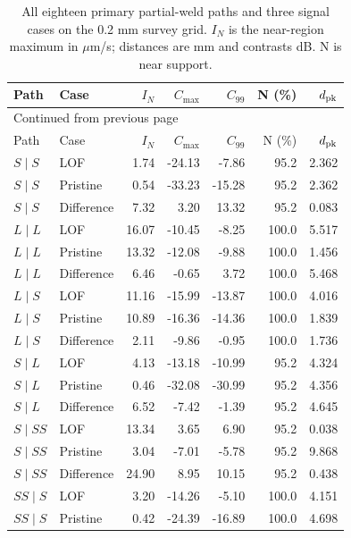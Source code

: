 {\small\setlength{\tabcolsep}{4pt}
\begin{longtable}{@{}llrrrrr@{}}
\caption{All eighteen primary partial-weld paths and three signal cases on the 0.2 mm survey grid. $I_N$ is the near-region maximum in $\mu$m/s; distances are mm and contrasts dB. N is near support.}\label{saftapp:archive:partial:primary_register}\\
\toprule Path & Case & $I_N$ & $C_{\max}$ & $C_{99}$ & N (\%) & $d_{\rm pk}$\\\midrule\endfirsthead
\multicolumn{7}{l}{\small Continued from previous page}\\\toprule Path & Case & $I_N$ & $C_{\max}$ & $C_{99}$ & N (\%) & $d_{\rm pk}$\\\midrule\endhead
\bottomrule\endfoot
$S\mid S$ & LOF & 1.74 & -24.13 & -7.86 & 95.2 & 2.362 \\
$S\mid S$ & Pristine & 0.54 & -33.23 & -15.28 & 95.2 & 2.362 \\
$S\mid S$ & Difference & 7.32 & 3.20 & 13.32 & 95.2 & 0.083 \\
\addlinespace
$L\mid L$ & LOF & 16.07 & -10.45 & -8.25 & 100.0 & 5.517 \\
$L\mid L$ & Pristine & 13.32 & -12.08 & -9.88 & 100.0 & 1.456 \\
$L\mid L$ & Difference & 6.46 & -0.65 & 3.72 & 100.0 & 5.468 \\
\addlinespace
$L\mid S$ & LOF & 11.16 & -15.99 & -13.87 & 100.0 & 4.016 \\
$L\mid S$ & Pristine & 10.89 & -16.36 & -14.36 & 100.0 & 1.839 \\
$L\mid S$ & Difference & 2.11 & -9.86 & -0.95 & 100.0 & 1.736 \\
\addlinespace
$S\mid L$ & LOF & 4.13 & -13.18 & -10.99 & 95.2 & 4.324 \\
$S\mid L$ & Pristine & 0.46 & -32.08 & -30.99 & 95.2 & 4.356 \\
$S\mid L$ & Difference & 6.52 & -7.42 & -1.39 & 95.2 & 4.645 \\
\addlinespace
$S\mid SS$ & LOF & 13.34 & 3.65 & 6.90 & 95.2 & 0.038 \\
$S\mid SS$ & Pristine & 3.04 & -7.01 & -5.78 & 95.2 & 9.868 \\
$S\mid SS$ & Difference & 24.90 & 8.95 & 10.15 & 95.2 & 0.438 \\
\addlinespace
$SS\mid S$ & LOF & 3.20 & -14.26 & -5.10 & 100.0 & 4.151 \\
$SS\mid S$ & Pristine & 0.42 & -24.39 & -16.89 & 100.0 & 4.698 \\

\end{longtable}}

